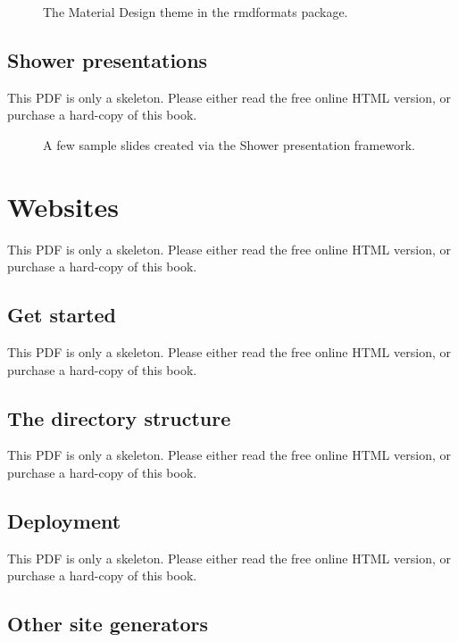 \documentclass[
  11pt,
]{krantz}
\theoremstyle{definition}
\theoremstyle{definition}
\theoremstyle{definition}
\theoremstyle{definition}
\theoremstyle{remark}
\begin{document}
\begin{figure}\caption{The Material Design theme in the rmdformats package.}\end{figure}

\section{Shower presentations}\label{shower-presentations}

This PDF is only a skeleton. Please either read the free online HTML version, or purchase a hard-copy of this book.

\begin{figure}\caption{A few sample slides created via the Shower presentation framework.}\end{figure}

\chapter{Websites}\label{websites}

This PDF is only a skeleton. Please either read the free online HTML version, or purchase a hard-copy of this book.

\section{Get started}\label{blogdown-start}

This PDF is only a skeleton. Please either read the free online HTML version, or purchase a hard-copy of this book.

\section{The directory structure}\label{blogdown-directory}

This PDF is only a skeleton. Please either read the free online HTML version, or purchase a hard-copy of this book.

\section{Deployment}\label{blogdown-deploy}

This PDF is only a skeleton. Please either read the free online HTML version, or purchase a hard-copy of this book.

\section{Other site generators}\label{blogdown-other}
\end{document}
